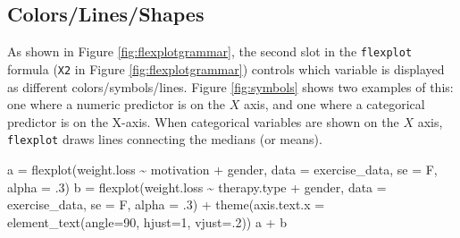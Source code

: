 \documentclass[
  english,
  man]{apa6}
\newenvironment{Shaded}{\begin{snugshade}}{\end{snugshade}}
\newcommand{\AttributeTok}[1]{\textcolor[rgb]{0.77,0.63,0.00}{#1}}
\newcommand{\DecValTok}[1]{\textcolor[rgb]{0.00,0.00,0.81}{#1}}
\newcommand{\FunctionTok}[1]{\textcolor[rgb]{0.00,0.00,0.00}{#1}}
\newcommand{\NormalTok}[1]{#1}
\newcommand{\OtherTok}[1]{\textcolor[rgb]{0.56,0.35,0.01}{#1}}
\newcommand{\SpecialCharTok}[1]{\textcolor[rgb]{0.00,0.00,0.00}{#1}}
\begin{document}
\normalsize

\hypertarget{colorslinesshapes}{%
\subsection{Colors/Lines/Shapes}\label{colorslinesshapes}}

As shown in Figure \ref{fig:flexplotgrammar}, the second slot in the \texttt{flexplot} formula (\texttt{X2} in Figure \ref{fig:flexplotgrammar}) controls which variable is displayed as different colors/symbols/lines. Figure \ref{fig:symbols} shows two examples of this: one where a numeric predictor is on the \(X\) axis, and one where a categorical predictor is on the X-axis. When categorical variables are shown on the \(X\) axis, \texttt{flexplot} draws lines connecting the medians (or means).

\small

\begin{Shaded}
\begin{Highlighting}[]
\NormalTok{a }\OtherTok{=} \FunctionTok{flexplot}\NormalTok{(weight.loss }\SpecialCharTok{\textasciitilde{}}\NormalTok{ motivation }\SpecialCharTok{+}\NormalTok{ gender, }
    \AttributeTok{data =}\NormalTok{ exercise\_data, }\AttributeTok{se =}\NormalTok{ F, }\AttributeTok{alpha =}\NormalTok{ .}\DecValTok{3}\NormalTok{)}
\NormalTok{b }\OtherTok{=} \FunctionTok{flexplot}\NormalTok{(weight.loss }\SpecialCharTok{\textasciitilde{}}\NormalTok{ therapy.type }\SpecialCharTok{+}\NormalTok{ gender, }
    \AttributeTok{data =}\NormalTok{ exercise\_data, }\AttributeTok{se =}\NormalTok{ F, }\AttributeTok{alpha =}\NormalTok{ .}\DecValTok{3}\NormalTok{) }\SpecialCharTok{+}
    \FunctionTok{theme}\NormalTok{(}\AttributeTok{axis.text.x =} \FunctionTok{element\_text}\NormalTok{(}\AttributeTok{angle=}\DecValTok{90}\NormalTok{, }\AttributeTok{hjust=}\DecValTok{1}\NormalTok{, }\AttributeTok{vjust=}\NormalTok{.}\DecValTok{2}\NormalTok{))}
\NormalTok{a }\SpecialCharTok{+}\NormalTok{ b}
\end{Highlighting}
\end{Shaded}
\end{document}
